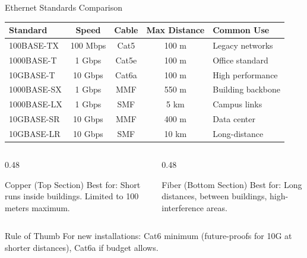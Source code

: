 \documentclass[aspectratio=169]{beamer}  %
\begin{document}
\begin{frame}{Ethernet Standards Comparison}
    \begin{center}
        \scriptsize
        \begin{tabular}{l c c c l}
            \toprule
            \textbf{Standard} & \textbf{Speed} & \textbf{Cable} & \textbf{Max Distance} & \textbf{Common Use} \\
            \midrule
            100BASE-TX & 100 Mbps & Cat5 & 100 m & Legacy networks \\
            1000BASE-T & 1 Gbps & Cat5e & 100 m & Office standard \\
            10GBASE-T & 10 Gbps & Cat6a & 100 m & High performance \\
            \midrule
            1000BASE-SX & 1 Gbps & MMF & 550 m & Building backbone \\
            1000BASE-LX & 1 Gbps & SMF & 5 km & Campus links \\
            10GBASE-SR & 10 Gbps & MMF & 400 m & Data center \\
            10GBASE-LR & 10 Gbps & SMF & 10 km & Long-distance \\
            \bottomrule
        \end{tabular}
    \end{center}
    
    \vspace{0.5em}
    \begin{columns}[T]
        \begin{column}{0.48\textwidth}
            \begin{block}{Copper (Top Section)}
                Best for: Short runs inside buildings. Limited to 100 meters maximum.
            \end{block}
        \end{column}
        \begin{column}{0.48\textwidth}
            \begin{block}{Fiber (Bottom Section)}
                Best for: Long distances, between buildings, high-interference areas.
            \end{block}
        \end{column}
    \end{columns}
    
    \vspace{0.3em}
    \begin{exampleblock}{Rule of Thumb}
        For new installations: Cat6 minimum (future-proofs for 10G at shorter distances), Cat6a if budget allows.
    \end{exampleblock}
\end{frame}
\end{document}
